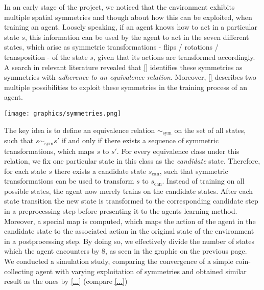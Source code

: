

In an early stage of the project, we noticed that the environment exhibits multiple spatial symmetries and though about how this can be exploited, when training an agent. Loosely speaking, if an agent knows how to act in a particular state $s$, this information can be used by the agent to act in the seven different states, which arise as symmetric transformations - flips / rotations / transposition - of the state $s$, given that its actions are transformed accordingly.
A search in relevant literature revealed that \ref{} identifies these symmetries as symmetries with \emph{adherence to an equivalence relation}. Moreover, \ref{} describes two multiple possibilities to exploit these symmetries in the training process of an agent.

\vspace{10pt}
\begin{center}
\begin{minipage}{\linewidth}
\texttt{[image: graphics/symmetries.png]}
\end{minipage}
\end{center}
\vspace{10pt}

The key idea is to define an equivalence relation $\sim_\text{sym}$ on the set of all states, such that $s \sim_\text{sym} s'$ if and only if there exists a sequence of symmetric transformations, which maps $s$ to $s'$. For every equivalence class under this relation, we fix one particular state in this class as the \emph{candidate} state. Therefore, for each state $s$ there exists a candidate state $s_\text{can}$, such that symmetric transformations can be used to transform $s$ to $s_\text{can}$. Instead of training on all possible states, the agent now merely trains on the candidate states. After each state transition the new state is transformed to the corresponding candidate step in a preprocessing step before presenting it to the agents learning method. Moreover, a special map is computed, which maps the action of the agent in the candidate state to the associated action in the original state of the environment in a postprocessing step. By doing so, we effectively divide the number of states which the agent encounters by 8, as seen in the graphic on the previous page. \\

We conducted a simulation study, comparing the convergence of a simple coin-collecting agent with varying exploitation of symmetries and obtained similar result as the ones by \ref{...} (compare \ref{...})